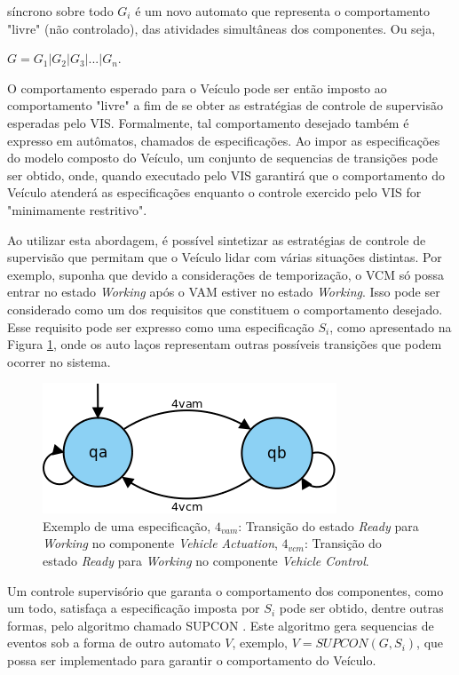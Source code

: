 \documentclass[conference]{IEEEtran}
\begin{document}
síncrono sobre todo $G_{i}$ é um novo automato que representa o comportamento "livre" (não controlado), das atividades simultâneas dos componentes. Ou seja, 

$G = G_{1} \lvert G_{2} \lvert G_{3} \lvert ... \lvert G_{n}$.  

O comportamento esperado para o Veículo pode ser então imposto ao comportamento "livre" a fim de se obter as estratégias de controle de supervisão esperadas pelo VIS. Formalmente, tal comportamento desejado também é expresso em autômatos, chamados de especificações. Ao impor as especificações do modelo composto do Veículo, um conjunto de sequencias de transições pode ser obtido, onde, quando executado pelo VIS garantirá que o comportamento do Veículo atenderá as especificações enquanto o controle exercido pelo VIS for "minimamente restritivo".

Ao utilizar esta abordagem, é possível sintetizar as estratégias de controle de supervisão que permitam que o Veículo lidar com várias situações distintas. Por exemplo, suponha que devido a considerações de temporização, o VCM só possa entrar no estado \textit{Working} após o VAM estiver no estado \textit{Working}. Isso pode ser considerado como um dos requisitos que constituem o comportamento desejado. Esse requisito pode ser expresso como uma especificação $S_{i}$, como apresentado na Figura \ref{fig:exemplo_especificacao}, onde os auto laços representam outras possíveis transições que podem ocorrer no sistema.


\begin{figure}[h]
	\centering
	\includegraphics[scale=0.4]{files/VILMA_TRANSITION_EXAMPLE.png}
	\caption{Exemplo de uma especificação, $4_{vam}$: Transição do estado \textit{Ready} para \textit{Working} no componente \textit{Vehicle Actuation}, $4_{vcm}$: Transição do estado \textit{Ready} para \textit{Working} no componente \textit{Vehicle Control}.  }
	\label{fig:exemplo_especificacao}
\end{figure}

Um controle supervisório que garanta o comportamento dos componentes, como um todo, satisfaça a especificação imposta por $S_{i}$ pode ser obtido, dentre outras formas, pelo algoritmo chamado SUPCON \cite{wonham1987supremal}. Este algoritmo gera sequencias de eventos sob a forma de outro automato $V$, exemplo, $ V = SUPCON(G,S_{i})$, que possa ser implementado para garantir o comportamento do Veículo.
\end{document}
